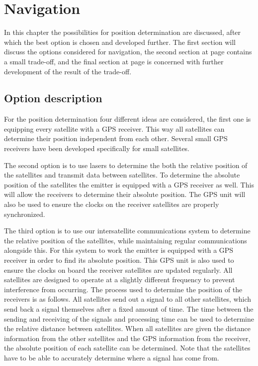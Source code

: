 \section{Navigation}
\label{NaviEmitter}
In this chapter the possibilities for position determination are discussed, after which the best option is chosen and developed further. The first section will discuss the options considered for navigation, the second section at page \pageref{navi2} contains a small trade-off, and the final section at page \pageref{navi3} is concerned with further development of the result of the trade-off.

\subsection{Option description}
\label{navi1}
For the position determination four different ideas are considered, the first one is equipping every satellite with a \acs{GPS} receiver. This way all satellites can determine their position independent from each other. Several small \acs{GPS} receivers have been developed specifically for small satellites.

The second option is to use lasers to determine the both the relative position of the satellites and transmit data between satellites. To determine the absolute position of the satellites the emitter is equipped with a \acs{GPS} receiver as well. This will allow the receivers to determine their absolute position. The \acs{GPS} unit will also be used to ensure the clocks on the receiver satellites are properly synchronized.

The third option is to use our intersatellite communications system to determine the relative position of the satellites, while maintaining regular communications alongside this. For this system to work the emitter is equipped with a GPS receiver in order to find its absolute position. This GPS unit is also used to ensure the clocks on board the receiver satellites are updated regularly. All satellites are designed to operate at a slightly different frequency to prevent interference from occurring. 
The process used to determine the position of the receivers is as follows. All satellites send out a signal to all other satellites, which send back a signal themselves after a fixed amount of time. The time between the sending and receiving of the signals and processing time can be used to determine the relative distance between satellites. When all satellites are given the distance information from the other satellites and the GPS information from the receiver, the absolute position of each satellite can be determined. Note that the satellites have to be able to accurately determine where a signal has come from.


